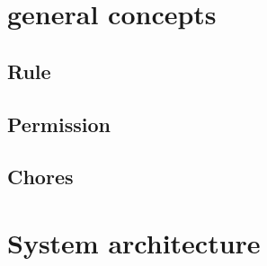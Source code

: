 %


\section{general concepts}
\subsection{Rule}
\subsection{Permission}
\subsection{Chores}


\section{System architecture}




